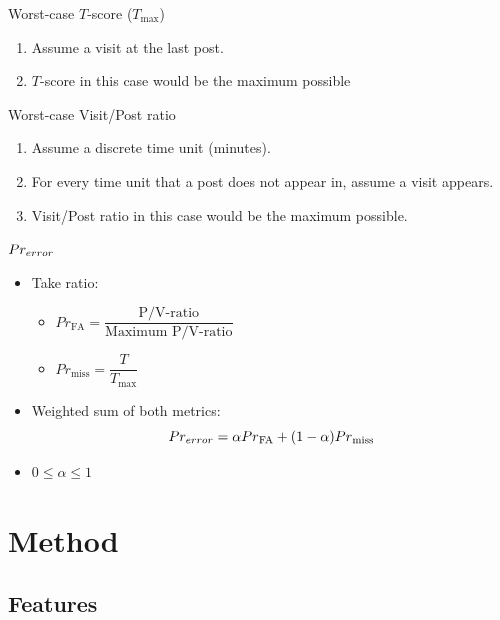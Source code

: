 \documentclass[12pt]{../presentation}
\begin{document}
	\begin{frame}{Worst-case $T$-score ($T_\text{max}$)}
	\begin{center}
		
	\end{center}
	\begin{enumerate}
		\item Assume a visit at the last post.
		\item $T$-score in this case would be the maximum possible
	\end{enumerate}
	\end{frame}
	\begin{frame}{Worst-case Visit/Post ratio}
	\begin{center}
		
	\end{center}
	\begin{enumerate}
		\item Assume a discrete time unit (minutes).
		\item For every time unit that a post does not appear in, assume a visit 
			appears.
		\item Visit/Post ratio in this case would be the maximum possible.
		\end{enumerate}
	\end{frame}
	\begin{frame}{$Pr_{error}$}
		\begin{itemize}
			\item Take ratio:
				\begin{itemize}
					\item $
							{Pr}_{\text{FA}} = 
							\dfrac{\text{P/V-ratio}}{\text{Maximum P/V-ratio}}
						$\\
					\item $
							{Pr}_{\text{miss}} = \dfrac{T}{T_\text{max}}
						$
				\end{itemize}
			\item Weighted sum of both metrics:	\[
				Pr_{error} = \alpha {Pr}_{\text{FA}} + 
(1-\alpha){Pr}_{\text{miss}}
			\]
			\item $0 \leq \alpha \leq 1$
		\end{itemize}
	\end{frame}


\section{Method}
\subsection{Features}
\end{document}
